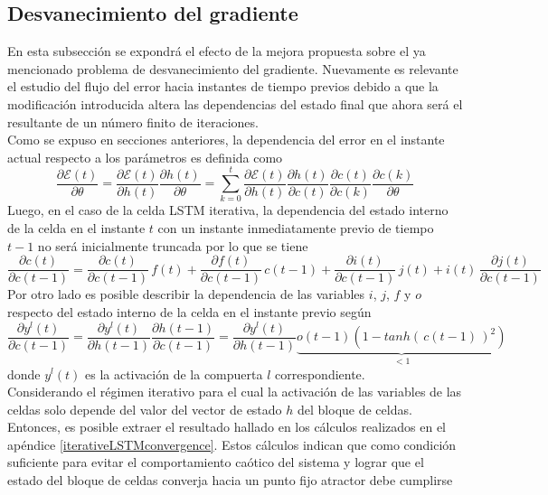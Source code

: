 \documentclass{article}
\begin{document}
	\subsection{Desvanecimiento del gradiente}
	En esta subsección se expondrá el efecto de la mejora propuesta sobre el ya mencionado problema de desvanecimiento del gradiente. Nuevamente es relevante el estudio del flujo del error hacia instantes de tiempo previos debido a que la modificación introducida altera las dependencias del estado final que ahora será el resultante de un número finito de iteraciones.\\
	Como se expuso en secciones anteriores, la dependencia del error en el instante actual respecto a los parámetros es definida como
	\begin{equation*}
	\dfrac{\partial \mathcal{E}(t)}{\partial \theta} = \dfrac{\partial \mathcal{E}(t)}{\partial h(t)} \dfrac{\partial h(t)}{\partial \theta} =\sum_{k=0}^{t} \dfrac{\partial \mathcal{E}(t)}{\partial h(t)} \dfrac{\partial h(t)}{\partial c(t)}\dfrac{\partial c(t)}{\partial c(k)}\dfrac{\partial c(k)}{\partial \theta}
	\end{equation*}
	Luego, en el caso de la celda LSTM iterativa, la dependencia del estado interno de la celda en el instante $t$ con un instante inmediatamente previo de tiempo $t-1$ no será inicialmente truncada por lo que se tiene
	\begin{equation*}
	\dfrac{\partial c(t)}{\partial c(t-1)} =  \dfrac{\partial c(t)}{\partial c(t-1)} \,  f(t) + \dfrac{\partial f(t)}{\partial c(t-1)} \, c(t-1) + \dfrac{\partial i(t)}{\partial c(t-1)} \, j(t) + i(t) \, \dfrac{\partial j(t)}{\partial c(t-1)} 
	\end{equation*}
	Por otro lado es posible describir la dependencia de las variables $i$, $j$, $f$ y $o$ respecto del estado interno de la celda en el instante previo según
	\begin{equation*}
	\dfrac{\partial y^l(t)}{\partial c(t-1)} =  \dfrac{\partial y^l(t)}{\partial h(t-1)} \dfrac{\partial h(t-1)}{\partial c(t-1)} = \dfrac{\partial y^l(t)}{\partial h(t-1)} \underbrace{o(t-1)(1- tanh( \,c(t-1) \,)^2)}_{<1}
	\end{equation*}
	donde $y^l(t)$ es la activación de la compuerta $l$ correspondiente. \\
	Considerando el régimen iterativo para el cual la activación de las variables de las celdas solo depende del valor del vector de estado $h$ del bloque de celdas. Entonces, es posible extraer el resultado hallado en los cálculos realizados en el apéndice \ref{iterativeLSTMconvergence}. Estos cálculos indican que como condición suficiente para evitar el comportamiento caótico del sistema y lograr que el estado del bloque de celdas converja hacia un punto fijo atractor debe cumplirse
\end{document}
